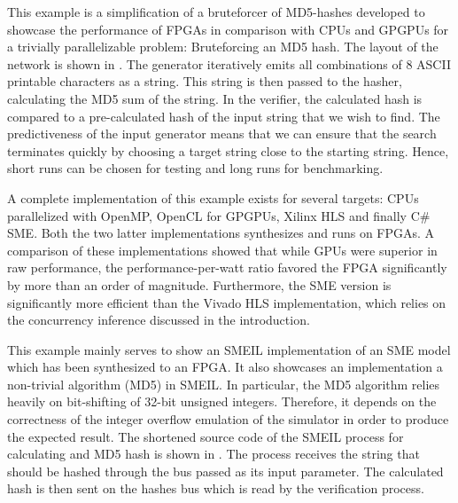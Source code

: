 This example is a simplification of a bruteforcer of MD5-hashes developed to
showcase the performance of FPGAs in comparison with CPUs and GPGPUs for a
trivially parallelizable problem: Bruteforcing an MD5 hash. The layout of the
network is shown in . The generator iteratively emits all
combinations of 8 ASCII printable characters as a string. This string is then
passed to the hasher, calculating the MD5 sum of the string. In the verifier,
the calculated hash is compared to a pre-calculated hash of the input string
that we wish to find. The predictiveness of the input generator means that we
can ensure that the search terminates quickly by choosing a target string close
to the starting string. Hence, short runs can be chosen for testing and long
runs for benchmarking.

A complete implementation of this example exists for several targets: CPUs
parallelized with OpenMP, OpenCL for GPGPUs, Xilinx HLS and finally C\# SME.
Both the two latter implementations synthesizes and runs on FPGAs. A comparison
of these implementations showed that while GPUs were superior in raw
performance, the performance-per-watt ratio favored the FPGA significantly by
more than an order of magnitude. Furthermore, the SME version is significantly
more efficient than the Vivado HLS implementation, which relies on the
concurrency inference discussed in the introduction.

This example mainly serves to show an SMEIL implementation of an SME model which
has been synthesized to an FPGA. It also showcases an implementation a
non-trivial algorithm (MD5) in SMEIL. In particular, the MD5 algorithm relies
heavily on bit-shifting of 32-bit unsigned integers. Therefore, it depends on
the correctness of the integer overflow emulation of the \libsme{} simulator in
order to produce the expected result. The shortened source code of the SMEIL
process for calculating and MD5 hash is shown in . The
process receives the string that should be hashed through the bus passed as its
{\ttfamily input} parameter. The calculated hash is then sent on the {\ttfamily hashes} bus
which is read by the verification process.

